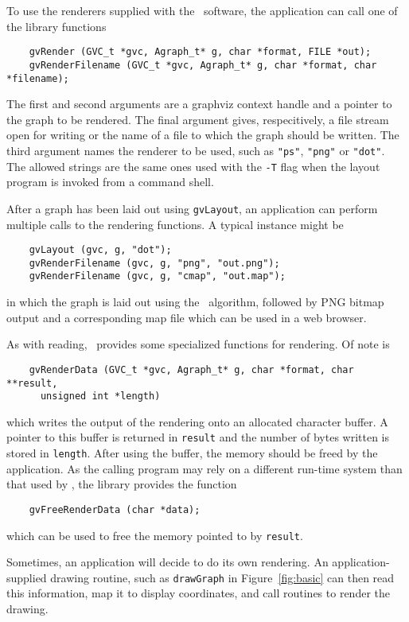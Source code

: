 To use the renderers supplied with the \gviz\ software, the application
can call one of the library functions 
\begin{verbatim}
    gvRender (GVC_t *gvc, Agraph_t* g, char *format, FILE *out);
    gvRenderFilename (GVC_t *gvc, Agraph_t* g, char *format, char *filename);
\end{verbatim}
The first and second arguments are a graphviz context handle and a pointer
to the graph to be rendered. The final argument gives, respecitively,
a file stream open for writing or the name of a file to which the
graph should be written. The third argument names the renderer to
be used, such as {\tt "ps"}, {\tt "png"} or {\tt "dot"}.
The allowed strings are the same ones used with the {\tt -T} flag
when the layout program is invoked from a command shell.

After a graph has been laid out using {\tt gvLayout}, an application
can perform multiple calls to the rendering functions. A typical instance
might be  
\begin{verbatim}
    gvLayout (gvc, g, "dot");
    gvRenderFilename (gvc, g, "png", "out.png");
    gvRenderFilename (gvc, g, "cmap", "out.map");
\end{verbatim}
in which the graph is laid out using the \dot\ algorithm, followed by
PNG bitmap output and a corresponding map file which can be used in a web
browser.

As with reading, \gviz\ provides some specialized functions for rendering.
Of note is
\begin{verbatim}
    gvRenderData (GVC_t *gvc, Agraph_t* g, char *format, char **result, 
      unsigned int *length)
\end{verbatim}
which writes the output of the rendering onto an allocated character buffer. A pointer
to this buffer is returned in {\tt *result} and the number of bytes written is stored in
{\tt length}. After using the buffer, the memory should be freed by the application.
As the calling program may rely on a different run-time system than that used by
\gviz, the library provides the function 
\begin{verbatim}
    gvFreeRenderData (char *data); 
\end{verbatim}
which can be used to free the memory pointed to by {\tt *result}.

Sometimes, an application will decide to do its own rendering.
An application-supplied
drawing routine, such as {\tt drawGraph} in Figure~\ref{fig:basic}
can then read this information,
map it to display coordinates, and call routines to render the drawing.

